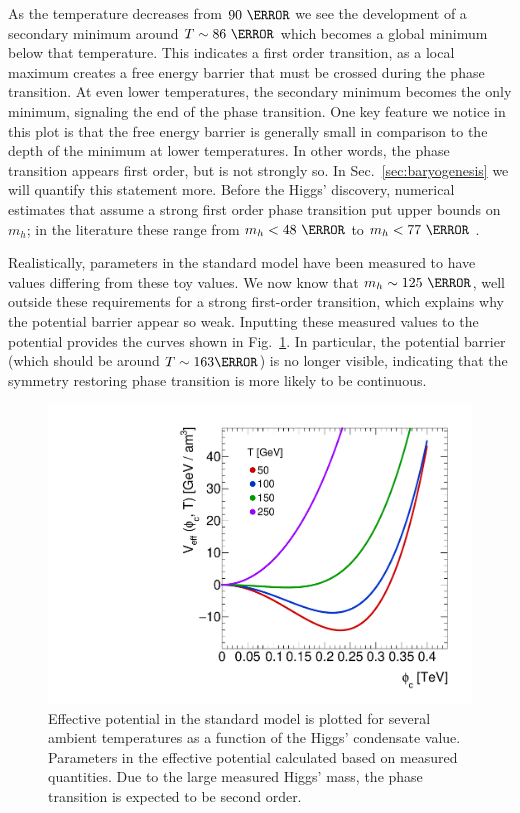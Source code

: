 \documentclass[%
 reprint,
nofootinbib,
 amsmath,amssymb,
 aps,
floatfix,
]{revtex4-1}
\begin{document}
As the temperature decreases from $90~\GeV$ we see the development of a secondary minimum around $T\sim86~\GeV$ which becomes a global minimum below that temperature.
This indicates a first order transition, as a local maximum creates a free energy barrier that must be crossed during the phase transition.
At even lower temperatures, the secondary minimum becomes the only minimum, signaling the end of the phase transition.
One key feature we notice in this plot is that the free energy barrier is generally small in comparison to the depth of the minimum at lower temperatures.
In other words, the phase transition appears first order, but is not strongly so.
In Sec.~\ref{sec:baryogenesis} we will quantify this statement more.
Before the Higgs' discovery, numerical estimates that assume a strong first order phase transition put upper bounds on $m_h$; in the literature these range from $m_h < 48~\GeV$ \cite{long12} to $m_h < 77~\GeV$ \cite{gr93}.

Realistically, parameters in the standard model have been measured to have values differing from these toy values.
We now know that $m_h\sim125~\GeV$, well outside these requirements for a strong first-order transition, which explains why the potential barrier appear so weak.
Inputting these measured values to the potential provides the curves shown in Fig.~\ref{fig:sm_effpot}. In particular, the potential barrier (which should be around $T\sim163\GeV$) is no longer visible, indicating that the symmetry restoring phase transition is more likely to be continuous.
\begin{figure}
    \centering
    \includegraphics[width=\linewidth]{sm_effpot.pdf}
    \caption{Effective potential in the standard model is plotted for several ambient temperatures as a function of the Higgs' condensate value. Parameters in the effective potential calculated based on measured quantities. Due to the large measured Higgs' mass, the phase transition is expected to be second order.}
    \label{fig:sm_effpot}
\end{figure}
\end{document}

